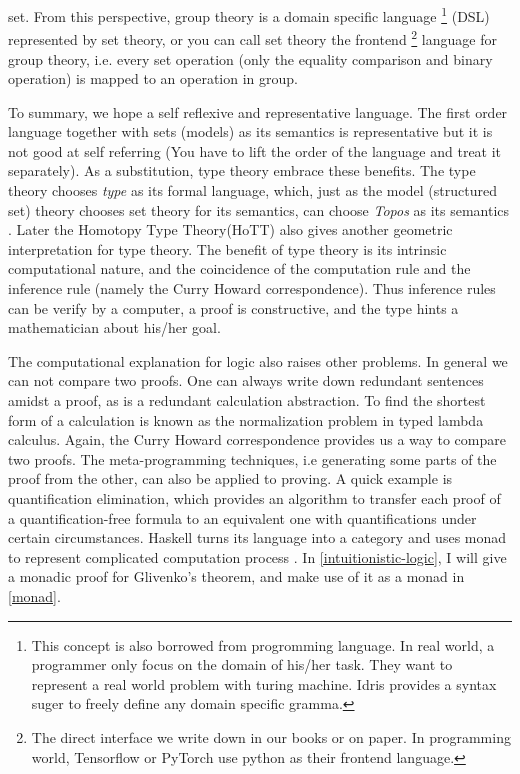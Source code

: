 set. From this perspective, group theory is a domain specific language
\footnote{This concept is also borrowed from progromming language.
In real world, a programmer only focus on the domain of his/her task.
They want to represent a real world problem with turing machine. Idris
provides a syntax suger to freely define any domain specific gramma.} 
(DSL) represented by set theory, or you can call set theory the frontend 
\footnote{The direct interface we write down in our books or on paper. 
In programming world, Tensorflow or PyTorch use python as their frontend 
language.} language for group theory, i.e. every set operation (only the 
equality comparison and binary operation) is mapped to an operation in 
group. 

To summary, we hope a self reflexive and representative language. The
first order language together with sets (models) as its semantics is
representative but it is not good at self referring (You have to lift
the order of the language and treat it separately). As a substitution, 
type theory embrace these benefits. The type theory 
\cite{intuitionistic-type-theory} chooses {\it type} as its formal 
language, which, just as the model (structured set) theory chooses set 
theory for its semantics, can choose {\it Topos} as 
its semantics \cite{Introduction-to-higher-order-categorical-logic,
categorical-logic-and-type-theory}. Later the Homotopy Type Theory(HoTT)
\cite{homotopy-type-theory,univalence} also gives another 
geometric interpretation for type theory. The benefit of type
theory is its intrinsic computational nature, and the coincidence of the
computation rule and the inference rule (namely the Curry Howard 
correspondence). Thus inference rules can be verify by a computer, 
a proof is constructive, and the type hints a mathematician about 
his/her goal\cite{coq}.

The computational explanation for logic also raises other problems.
In general we can not compare two proofs. One can always write down
redundant sentences amidst a proof, as is a redundant calculation
abstraction. To find the shortest form of a calculation is known as
the normalization problem in typed lambda calculus\cite{Curry-Howard}.
Again, the Curry Howard correspondence provides us a way to compare two
proofs. The meta-programming techniques, i.e generating some parts of
the proof from the other, can also be applied to proving. A quick example
is quantification elimination, which provides an algorithm to transfer
each proof of a quantification-free formula to an equivalent one with
quantifications under certain circumstances. Haskell
turns its language into a category and uses monad to represent
complicated computation process 
\cite{the-essence-of-functional-programming}. 
In \autoref{intuitionistic-logic},
I will give a monadic proof for Glivenko's theorem, and make use of
it as a monad in \autoref{monad}. 
